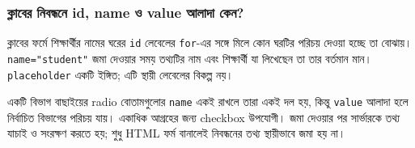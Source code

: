 \subsubsection{ক্লাবের নিবন্ধনে id, name ও value আলাদা কেন?}
ক্লাবের ফর্মে শিক্ষার্থীর নামের ঘরের \texttt{id} লেবেলের \texttt{for}-এর সঙ্গে মিলে কোন ঘরটির পরিচয় দেওয়া হচ্ছে তা বোঝায়। \texttt{name="student"} জমা দেওয়ার সময় তথ্যটির নাম এবং শিক্ষার্থী যা লিখেছেন তা তার বর্তমান মান। \texttt{placeholder} একটি ইঙ্গিত; এটি স্থায়ী লেবেলের বিকল্প নয়।

একটি বিভাগ বাছাইয়ের radio বোতামগুলোর \texttt{name} একই রাখলে তারা একই দল হয়, কিন্তু \texttt{value} আলাদা হলে নির্বাচিত বিভাগের পরিচয় যায়। একাধিক আগ্রহের জন্য checkbox উপযোগী। জমা দেওয়ার পর সার্ভারকে তথ্য যাচাই ও সংরক্ষণ করতে হয়; শুধু HTML ফর্ম বানালেই নিবন্ধনের তথ্য স্থায়ীভাবে জমা হয় না।
